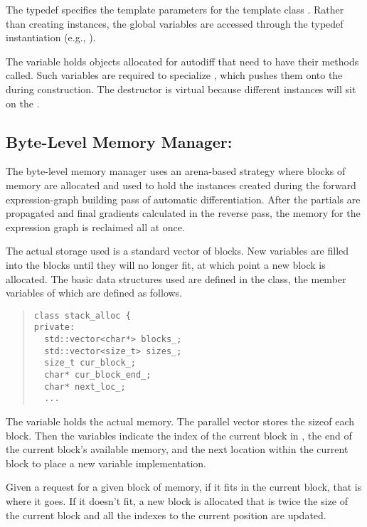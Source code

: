 \documentclass[10pt]{article}
\begin{document}
The typedef  specifies the template parameters
for the template class .   Rather than
creating instances,  the global variables are accessed through the
typedef instantiation (e.g., ).

The  variable holds objects allocated for
autodiff that need to have their  methods called.  Such
variables are required to specialize , which
pushes them onto the  during construction.
The destructor is virtual because different instances will sit on the
.





\subsection{Byte-Level Memory Manager:  }

The byte-level memory manager uses an arena-based strategy where
blocks of memory are allocated and used to hold the 
instances created during the forward expression-graph building pass of
automatic differentiation.  After the partials are propagated and final
gradients calculated in the reverse pass, the memory for the
expression graph is reclaimed all at once.

The actual storage used is a standard vector of  blocks.  
New variables are filled into the blocks until they will no longer
fit, at which point a new block is allocated.  The basic data
structures used are defined in the  class,
the member variables of which are defined as follows.
%
\begin{quote}
\begin{Verbatim}
class stack_alloc {
private: 
  std::vector<char*> blocks_;
  std::vector<size_t> sizes_;
  size_t cur_block_;
  char* cur_block_end_;
  char* next_loc_;
  ...
\end{Verbatim}
\end{quote}
%
The variable  holds the actual memory.  
The parallel vector  stores the sizeof each block.
Then the variables indicate the index of the current block in
, the end of the current block's available memory, and
the next location within the current block to place a new variable
implementation.  

Given a request for a given block of memory, if it fits in the
current block, that is where it goes.  If it doesn't fit, a new block
is allocated that is twice the size of the current block and all the
indexes to the current position are updated.  
\end{document}
